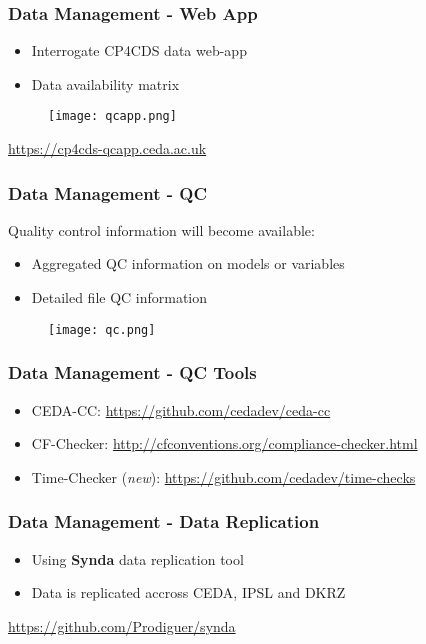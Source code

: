 \documentclass{beamer}
\begin{document}
\begin{frame}
\frametitle<presentation>{Data Management - Web App}
  \begin{itemize}
    \item Interrogate CP4CDS data web-app
    \item Data availability matrix
  \end{itemize}

  \begin{figure}[ht]
    \centering
    \texttt{[image: qcapp.png]}
  \end{figure}

  \centering
  \footnotesize{\url{https://cp4cds-qcapp.ceda.ac.uk}}


\end{frame}

\begin{frame}
\frametitle<presentation>{Data Management - QC}
  Quality control information will become available:
  \begin{itemize}
    \item Aggregated QC information on models or variables
    \item Detailed file QC information
  \end{itemize}

  \begin{figure}[ht]
    \centering
    \texttt{[image: qc.png]}
  \end{figure}

\end{frame}

\begin{frame}
\frametitle<presentation>{Data Management - QC Tools}
  \begin{itemize}
    \item CEDA-CC: \url{https://github.com/cedadev/ceda-cc}
    \item CF-Checker: \url{http://cfconventions.org/compliance-checker.html}
    \item Time-Checker (\emph{new}): \url{https://github.com/cedadev/time-checks}
  \end{itemize}

\end{frame}

\begin{frame}
\frametitle<presentation>{Data Management - Data Replication}
  \begin{itemize}
    \item Using {\bf Synda} data replication tool
    \item Data is replicated accross CEDA, IPSL and DKRZ
  \end{itemize}

  \centering
  \footnotesize{\url{https://github.com/Prodiguer/synda}}

\end{frame}
\end{document}
